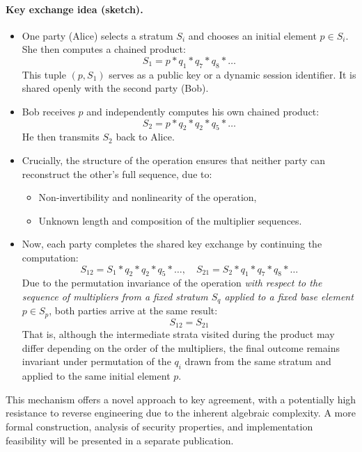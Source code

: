 \documentclass[12pt]{article}
\theoremstyle{definition}
\theoremstyle{plain}
\theoremstyle{remark}
\begin{document}
\paragraph{Key exchange idea (sketch).}
\begin{itemize}
    \item One party (Alice) selects a stratum \( S_i \) and chooses an initial element \( p \in S_i \). She then computes a chained product:
    \[
    S_1 = p * q_1 * q_7 * q_8 * \dots
    \]
    This tuple \( (p, S_1) \) serves as a public key or a dynamic session identifier. It is shared openly with the second party (Bob).

    \item Bob receives \( p \) and independently computes his own chained product:
    \[
    S_2 = p * q_2 * q_2 * q_5 * \dots
    \]
    He then transmits \( S_2 \) back to Alice.

    \item Crucially, the structure of the operation ensures that neither party can reconstruct the other's full sequence, due to:
    \begin{itemize}
        \item Non-invertibility and nonlinearity of the operation,
        \item Unknown length and composition of the multiplier sequences.
    \end{itemize}

    \item Now, each party completes the shared key exchange by continuing the computation:
    \[
    S_{12} = S_1 * q_2 * q_2 * q_5 * \dots,\quad
    S_{21} = S_2 * q_1 * q_7 * q_8 * \dots
    \]
    Due to the permutation invariance of the operation \emph{with respect to the sequence of multipliers from a fixed stratum \( S_q \) applied to a fixed base element \( p \in S_p \)}, both parties arrive at the same result:
    \[
    S_{12} = S_{21}
    \]
    That is, although the intermediate strata visited during the product may differ depending on the order of the multipliers, the final outcome remains invariant under permutation of the \( q_i \) drawn from the same stratum and applied to the same initial element \( p \).
\end{itemize}

This mechanism offers a novel approach to key agreement, with a potentially high resistance to reverse engineering due to the inherent algebraic complexity. A more formal construction, analysis of security properties, and implementation feasibility will be presented in a separate publication.
\end{document}
